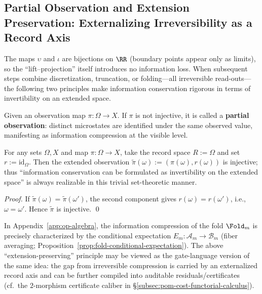 \subsection{Partial Observation and Extension Preservation: Externalizing Irreversibility as a Record Axis}\label{subsec:unit-circle-phase-information}
The maps \(\upsilon\) and \(\iota\) are bijections on \(\RR\) (boundary points appear only as limits), so the ``lift--projection'' itself introduces no information loss.
When subsequent steps combine discretization, truncation, or folding---all irreversible read-outs---the following two principles make information conservation rigorous in terms of invertibility on an extended space.

\begin{definition}\label{def:unit-circle-phase-partial-observation}
Given an observation map \(\pi:\Omega\to X\). If \(\pi\) is not injective, it is called a \textbf{partial observation}: distinct microstates are identified under the same observed value, manifesting as information compression at the visible level.
\end{definition}

\begin{proposition}\label{prop:unit-circle-phase-extension-preserving}
For any sets \(\Omega,X\) and map \(\pi:\Omega\to X\), take the record space \(R:=\Omega\) and set \(r:=\mathrm{id}_\Omega\).
Then the extended observation
\(
\widetilde\pi(\omega):=(\pi(\omega),r(\omega))
\)
is injective; thus ``information conservation can be formulated as invertibility on the extended space'' is always realizable in this trivial set-theoretic manner.
\end{proposition}
\begin{proof}
If \(\widetilde\pi(\omega)=\widetilde\pi(\omega')\), the second component gives \(r(\omega)=r(\omega')\), i.e., \(\omega=\omega'\). Hence \(\widetilde\pi\) is injective. \qed
\end{proof}

\begin{remark}
In Appendix~\ref{app:op-algebra}, the information compression of the fold \(\Fold_m\) is precisely characterized by the conditional expectation \(E_m:\mathcal{A}_m\to\mathcal{B}_m\) (fiber averaging; Proposition~\ref{prop:fold-conditional-expectation}).
The above ``extension-preserving'' principle may be viewed as the gate-language version of the same idea: the gap from irreversible compression is carried by an externalized record axis and can be further compiled into auditable residuals/certificates (cf.\ the \(2\)-morphism certificate caliber in \S\ref{subsec:pom-cost-functorial-calculus}).
\end{remark}
